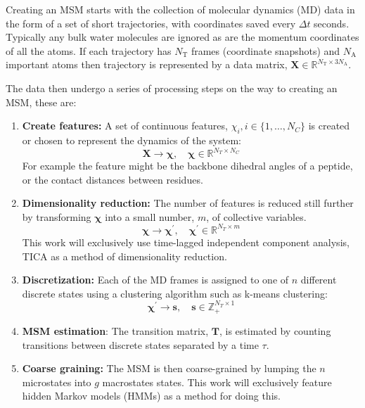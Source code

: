 Creating an MSM starts with the collection of molecular dynamics (MD) data in the form of a set of short trajectories, with coordinates saved every $\Delta t$ seconds. Typically any bulk water molecules are ignored as are the momentum coordinates of all the atoms. If  each trajectory has $N_{\mathrm{T}}$ frames (coordinate snapshots) and $N_{\mathrm{A}}$ important atoms then trajectory is represented by a data matrix, $\mathbf{X} \in \mathbb{R}^{N_{\mathrm{T}} \times 3N_{\mathrm{A}}}$. 

The data then undergo a series of processing steps on the way to creating an MSM, these are: 

\begin{enumerate}
    \item \textbf{Create features:} A set of continuous features, $\chi_{i}, i \in \{1,\dots, N_{C} \}$ is created or chosen to represent the dynamics of the system:
    \begin{equation*}
        \mathbf{X}  \rightarrow \bm{\chi},\quad \bm{\chi} \in \mathbb{R}^{N_{T} \times N_{C}}
    \end{equation*}
    For example the feature might be the backbone dihedral angles of a peptide, or the contact distances between residues. 
    \item \textbf{Dimensionality reduction:} The number of features is reduced still further by transforming $\bm{\chi}$ into a small number, $m$, of collective variables. 
    \begin{equation*}
        \bm{\chi}  \rightarrow \bm{\chi}^{\prime},\quad \bm{\chi}^{\prime} \in \mathbb{R}^{N_{T} \times m}
    \end{equation*}
    This work will exclusively use time-lagged independent component analysis, TICA as a method of dimensionality reduction.  
    \item \textbf{Discretization:} Each of the MD frames is assigned to one of $n$ different discrete states using a clustering algorithm such as k-means clustering: 
    \begin{equation*}
        \bm{\chi}^{\prime} \rightarrow \mathbf{s},\quad \mathbf{s} \in \mathbb{Z}_{+}^{N_{T} \times 1}
    \end{equation*}
    \item \textbf{MSM estimation}: The transition matrix, $\mathbf{T}$, is estimated by counting transitions between discrete states separated by a time $\tau$. 
    \item \textbf{Coarse graining:} The MSM is then coarse-grained by lumping the $n$ microstates into $g$ macrostates states. This work will exclusively feature hidden Markov models (HMMs) as a method for doing this. 
\end{enumerate}

